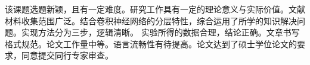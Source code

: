 
\begin{comments}

  该课题选题新颖，且有一定难度。研究工作具有一定的理论意义与实际价值。文献材料收集范围广泛。结合卷积神经网络的分层特性，综合运用了所学的知识解决问题。实现方法分为三步，逻辑清晰。
  实验所得的数据合理，结论正确。文章书写格式规范。论文工作量中等。语言流畅性有待提高。论文达到了硕士学位论文的要求，同意提交同行专家审查。

\end{comments}
